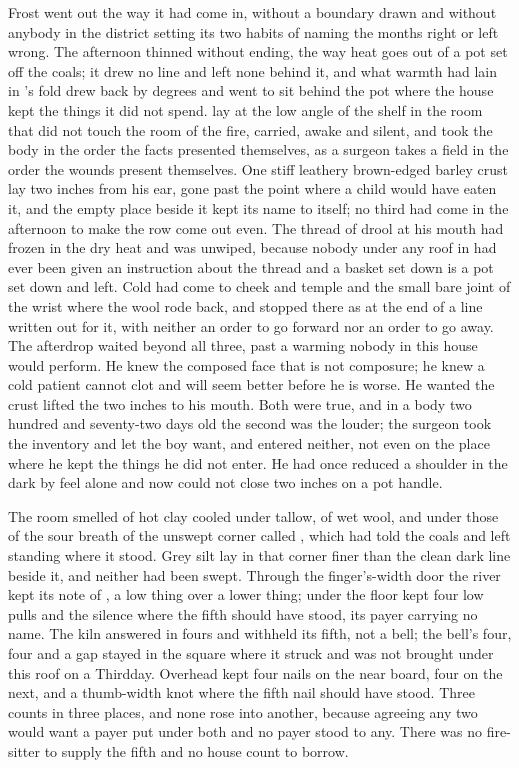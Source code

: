 Frost went out the way it had come in, without a boundary drawn and without anybody in the district setting its two habits of naming the months right or left wrong. The afternoon thinned without ending, the way heat goes out of a pot set off the coals; it drew no line and left none behind it, and what warmth had lain in 's fold drew back by degrees and went to sit behind the pot where the house kept the things it did not spend.  lay at the low angle of the shelf in the room that did not touch the room of the fire, carried, awake and silent, and took the body in the order the facts presented themselves, as a surgeon takes a field in the order the wounds present themselves. One stiff leathery brown-edged barley crust lay two inches from his ear, gone past the point where a child would have eaten it, and the empty place beside it kept its name to itself; no third had come in the afternoon to make the row come out even. The thread of drool at his mouth had frozen in the dry heat and was unwiped, because nobody under any roof in  had ever been given an instruction about the thread and a basket set down is a pot set down and left. Cold had come to cheek and temple and the small bare joint of the wrist where the wool rode back, and stopped there as at the end of a line written out for it, with neither an order to go forward nor an order to go away. The afterdrop waited beyond all three, past a warming nobody in this house would perform. He knew the composed face that is not composure; he knew a cold patient cannot clot and will seem better before he is worse. He wanted the crust lifted the two inches to his mouth. Both were true, and in a body two hundred and seventy-two days old the second was the louder; the surgeon took the inventory and let the boy want, and entered neither, not even on the place where he kept the things he did not enter. He had once reduced a shoulder in the dark by feel alone and now could not close two inches on a pot handle.

The room smelled of hot clay cooled under tallow, of wet wool, and under those of the sour breath of the unswept corner called , which  had told the coals and left standing where it stood. Grey silt lay in that corner finer than the clean dark line beside it, and neither had been swept. Through the finger's-width door the river kept its note of , a low thing over a lower thing; under the floor  kept four low pulls and the silence where the fifth should have stood, its payer carrying no name. The kiln answered in fours and withheld its fifth, not a bell; the bell's four, four and a gap stayed in the square where it struck and was not brought under this roof on a Thirdday. Overhead  kept four nails on the near board, four on the next, and a thumb-width knot where the fifth nail should have stood. Three counts in three places, and none rose into another, because agreeing any two would want a payer put under both and no payer stood to any. There was no fire-sitter to supply the fifth and no house count to borrow.

